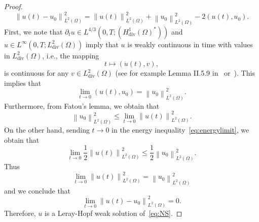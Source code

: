\documentclass[10pt,letterpaper]{amsart}
\newcommand\norm[1]{\left\lVert#1\right\rVert}
\newcommand{\Div}{\operatorname{div}}
\newcommand{\dom}{\Omega}
\theoremstyle{definition}{\newtheorem{definition}[lemma]{Definition}}
\numberwithin{equation}{section}
\begin{document}
\begin{proof}
	\begin{equation*}
		\norm{u(t)-u_0}_{L^2(\dom)}^2 = \norm{u(t)}_{L^2(\dom)}^2 + \norm{u_0}_{L^2(\dom)}^2 - 2 (u(t),u_0).
	\end{equation*}
First, we note that $\partial_t u\in L^{4/3}(0,T;(H^1_{\Div}(\dom)^*))$ and $u\in L^\infty(0,T;L^2_{\Div}(\dom))$ imply that $u$ is weakly continuous in time with values in $L^2_{\Div}(\dom)$, i.e., the mapping
\begin{equation*}
	t\mapsto (u(t),v),
\end{equation*}
is continuous for any $v\in L^2_{\Div}(\dom)$ (see for example Lemma II.5.9 in~\cite{Boyer2013} or~\cite{Temam1977}). This implies that
\begin{equation*}
	\lim_{t\to 0} (u(t),u_0) = \norm{u_0}_{L^2(\dom)}^2.
\end{equation*}
Furthermore, from Fatou's lemma, we obtain that
\begin{equation*}
	\norm{u_0}_{L^2(\dom)}^2 \leq \lim_{t\to 0}\norm{u(t)}_{L^2(\dom)}^2. 
\end{equation*}
On the other hand, sending $t\to 0$ in the energy inequality~\eqref{eq:energylimit}, we obtain that
\begin{equation*}
	\lim_{t\to 0}\frac12\norm{u(t)}_{L^2(\dom)}^2 \leq \frac12\norm{u_0}_{L^2(\dom)}^2.
\end{equation*}
Thus
\begin{equation*}
	\lim_{t\to 0} \norm{u(t)}_{L^2(\dom)}^2 = \norm{u_0}_{L^2(\dom)}^2 
\end{equation*}
and we conclude that
	\begin{equation*}
	\lim_{t\to 0}\norm{u(t)-u_0}_{L^2(\dom)}^2 = 0.
\end{equation*}
	Therefore,   $u$ is a Leray-Hopf weak solution of~\eqref{eq:NS}. 
\end{proof}
\end{document}
